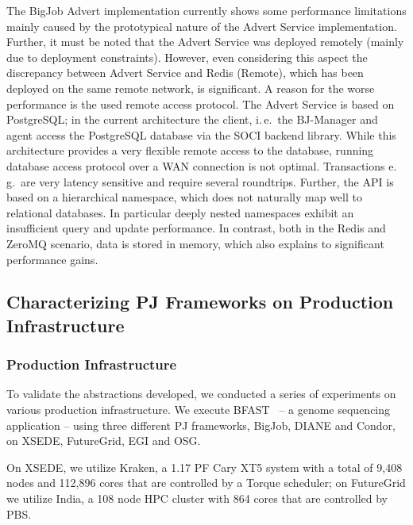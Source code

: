 \documentclass[conference,final]{IEEEtran}
\newcommand{\jhanote}[1]{ {\textcolor{red} { ***shantenu: #1 }}}
\newcommand{\alnote}[1]{ {\textcolor{blue} { ***andreL: #1 }}}
\newcommand{\alnote}[1]{}
\newcommand{\jhanote}[1]{}
\newcommand{\upp}{\vspace*{-0.5em}}
\begin{document}
The BigJob Advert implementation currently shows some performance
limitations mainly caused by the prototypical nature of the Advert
Service implementation.  Further, it must be noted that the Advert
Service was deployed remotely (mainly due to deployment
constraints). However, even considering this aspect the discrepancy
between Advert Service and Redis (Remote), which has been deployed on
the same remote network, is significant. A reason for the worse
performance is the used remote access protocol. The Advert Service is
based on PostgreSQL; in the current architecture the client, i.\,e.\
the BJ-Manager and agent access the PostgreSQL database via the SOCI
backend library. While this architecture provides a very flexible
remote access to the database, running database access protocol over a
WAN connection is not optimal. %
Transactions e.\,g.\ are very latency sensitive and require several
roundtrips.  Further, the API is based on a hierarchical namespace,
which does not naturally map well to relational databases. In
particular deeply nested namespaces exhibit an insufficient query and
update performance. In contrast, both in the Redis and ZeroMQ
scenario, data is stored in memory, which also explains to significant
performance gains.

\upp

\subsection{Characterizing PJ Frameworks on Production Infrastructure\upp\upp}
\label{sec:fg-xsede-osg-egi}

\subsubsection*{Production Infrastructure} To validate the abstractions
developed, we conducted a series of experiments on various production
infrastructure. We execute BFAST~\cite{bfast2009} -- a genome sequencing
application -- using three different PJ frameworks, BigJob, DIANE and Condor,
on XSEDE, FutureGrid, EGI and OSG.

On XSEDE, we utilize Kraken, a 1.17 PF Cary XT5 system with a total of 9,408
nodes and 112,896 cores that are controlled by a Torque scheduler; on FutureGrid
we utilize India, a 108 node HPC cluster with 864 cores that are controlled by
PBS.
\end{document}
